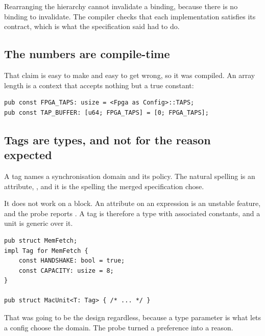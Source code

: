 Rearranging the hierarchy cannot invalidate a binding, because there is no
binding to invalidate. The compiler checks that each implementation
satisfies its contract, which is what the specification said 
had to do.

\subsection{The numbers are compile-time}

That claim is easy to make and easy to get wrong, so it was compiled. An
array length is a context that accepts nothing but a true constant:

\begin{lstlisting}
pub const FPGA_TAPS: usize = <Fpga as Config>::TAPS;
pub const TAP_BUFFER: [u64; FPGA_TAPS] = [0; FPGA_TAPS];
\end{lstlisting}

\subsection{Tags are types, and not for the reason expected}

A tag names a synchronisation domain and its policy. The natural spelling
is an attribute, \code{\#[tag(MemFetch, handshake, capacity = 8)]}, and it
is the spelling the merged specification chose.

It does not work on a block. An attribute on an expression is an unstable
feature, and the probe reports . A tag is therefore a
type with associated constants, and a unit is generic over it.

\begin{lstlisting}
pub struct MemFetch;
impl Tag for MemFetch {
    const HANDSHAKE: bool = true;
    const CAPACITY: usize = 8;
}

pub struct MacUnit<T: Tag> { /* ... */ }
\end{lstlisting}

That was going to be the design regardless, because a type parameter is
what lets a config choose the domain. The probe turned a preference into a
reason.
